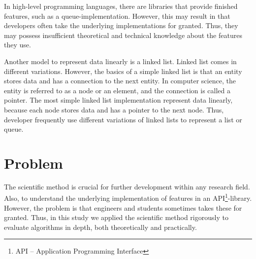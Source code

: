 \documentclass[a4paper,11pt]{kth-mag}
\newcommand*{\skippara}{\par\vspace{\baselineskip} \noindent}
\begin{document}
\skippara In high-level programming languages, there are libraries that provide finished features, such as a queue-implementation.
However, this may result in that developers often take the underlying implementations for granted.
Thus, they may possess insufficient theoretical and technical knowledge about the features they use.

\skippara Another model to represent data linearly is a linked list.
Linked list comes in different variations.
However, the basics of a simple linked list is that an entity stores data and has a connection to the next entity.
In computer science, the entity is referred to as a node or an element, and the connection is called a pointer.
The most simple linked list implementation represent data linearly, because each node stores data and has a pointer to the next node.
Thus, developer frequently use different variations of linked lists to represent a list or queue.



\section{Problem}\label{sec:problem}
The scientific method is crucial for further development within any research field.
Also, to understand the underlying implementation of features in an API\footnote{API -- Application Programming Interface}-library.
However, the problem is that engineers and students sometimes takes these for granted.
Thus, in this study we applied the scientific method rigorously to evaluate algorithms in depth, both theoretically and practically.
\end{document}
